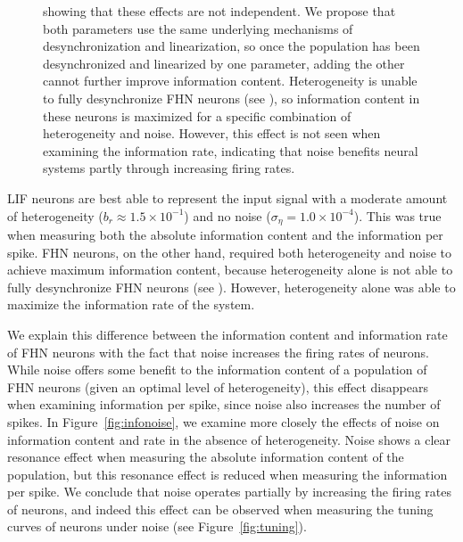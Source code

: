 \documentclass[letterpaper,11pt]{article}
\begin{document}
\begin{figure}
{showing that these effects are not independent.
We propose that both parameters use
the same underlying mechanisms of desynchronization and linearization,
so once the population has been desynchronized and linearized by one parameter,
adding the other cannot further improve information content.
Heterogeneity is unable to fully desynchronize FHN neurons (see \textsc{}),
so information content in these neurons is maximized for a specific combination of heterogeneity and noise. However, this effect is not seen when examining the information rate,
indicating that noise benefits neural systems partly through increasing firing rates.
  }
  \label{fig:infocontour}
\end{figure}

LIF neurons are best able to represent the input signal
with a moderate amount of heterogeneity ($b_r \approx 1.5 \times 10^{-1}$)
and no noise ($\sigma_\eta = 1.0 \times 10^{-4}$).
This was true when measuring both the absolute information content and the information per spike.
FHN neurons, on the other hand, required both heterogeneity and noise
to achieve maximum information content,
because heterogeneity alone is not able to fully desynchronize FHN neurons (see \textsc{}).
However, heterogeneity alone was able to maximize the information rate of the system.

We explain this difference between the information content and information rate of FHN neurons
with the fact that noise increases the firing rates of neurons.
While noise offers some benefit to the information content of a population of FHN neurons
(given an optimal level of heterogeneity),
this effect disappears when examining information per spike,
since noise also increases the number of spikes.
In Figure~\ref{fig:infonoise}, we examine more closely the effects of noise on information content and rate in the absence of heterogeneity. Noise shows a clear resonance effect when measuring the absolute information content of the population, but this resonance effect is reduced when measuring the information per spike. We conclude that noise operates partially by increasing the firing rates of neurons, and indeed this effect can be observed when measuring the tuning curves of neurons under noise (see Figure~\ref{fig:tuning}).
\end{document}
